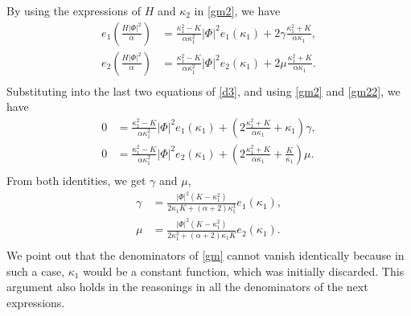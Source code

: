 \documentclass[a4paper,12pt]{amsart}
\theoremstyle{definition}
\begin{document}
By using the expressions of $H$ and $\kappa_2$ in \eqref{gm2},  we have
\begin{equation}\label{gm22}
\begin{split}
e_1(\frac{H|\Phi|^2}{\alpha})&= \frac{\kappa_1^2-K}{\alpha\kappa_1^2}|\Phi|^2e_1(\kappa_1)+2\gamma\frac{\kappa_1^2+K}{\alpha \kappa_1},\\
e_2(\frac{H|\Phi|^2}{\alpha})&= \frac{\kappa_1^2-K}{\alpha\kappa_1^2}|\Phi|^2e_2(\kappa_1)+2\mu\frac{\kappa_1^2+K}{\alpha \kappa_1}.\\
\end{split}
\end{equation}
Substituting into  the last two equations of \eqref{d3}, and  using \eqref{gm2} and \eqref{gm22}, we have
\begin{equation*}
\begin{split}
 0&=\frac{\kappa_1^2-K}{\alpha\kappa_1^2}|\Phi|^2e_1(\kappa_1)+\left(2\frac{\kappa_1^2+K}{\alpha \kappa_1} + \kappa_1\right)\gamma,\\
0 &= \frac{\kappa_1^2-K}{\alpha\kappa_1^2}|\Phi|^2e_2(\kappa_1)+\left(2\frac{\kappa_1^2+K}{\alpha \kappa_1}+ \frac{K}{\kappa_1}\right)\mu.\\
\end{split}
\end{equation*}
From both identities, we get $\gamma$ and $\mu$, 
\begin{equation}\label{gm}
\begin{split}
 \gamma&=\frac{|\Phi|^2(K-\kappa_1^2)}{2\kappa_1 K+(\alpha +2)\kappa_1^3}e_1(\kappa_1) ,\\
\mu&=\frac{|\Phi|^2(K-\kappa_1^2)}{2\kappa_1^3+(\alpha +2)\kappa_1 K}e_2(\kappa_1).\\
\end{split}
\end{equation}
We point out that the denominators of \eqref{gm} cannot vanish identically because in such a case, $\kappa_1$ would be a constant function, which was initially discarded. This argument also holds in the reasonings in all the denominators of the next expressions.
\end{document}
